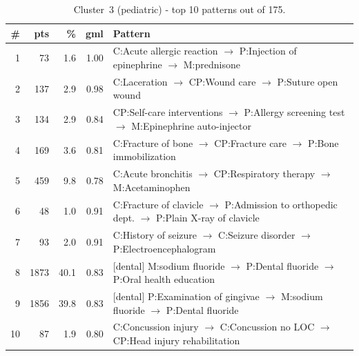 \begin{table}[H]
\centering
\footnotesize
\renewcommand{\arraystretch}{1.2}
\begin{tabular}{@{}r r r r p{10.5cm}@{}}
\toprule
\textbf{\#} & \textbf{pts} & \textbf{\%} & \textbf{gml} & \textbf{Pattern} \\
\midrule
1  &   73 &  1.6 & 1.00 & C:Acute allergic reaction $\to$ P:Injection of epinephrine $\to$ M:prednisone \\
2  &  137 &  2.9 & 0.98 & C:Laceration $\to$ CP:Wound care $\to$ P:Suture open wound \\
3  &  134 &  2.9 & 0.84 & CP:Self-care interventions $\to$ P:Allergy screening test $\to$ M:Epinephrine auto-injector \\
4  &  169 &  3.6 & 0.81 & C:Fracture of bone $\to$ CP:Fracture care $\to$ P:Bone immobilization \\
5  &  459 &  9.8 & 0.78 & C:Acute bronchitis $\to$ CP:Respiratory therapy $\to$ M:Acetaminophen \\
6  &   48 &  1.0 & 0.91 & C:Fracture of clavicle $\to$ P:Admission to orthopedic dept. $\to$ P:Plain X-ray of clavicle \\
7  &   93 &  2.0 & 0.91 & C:History of seizure $\to$ C:Seizure disorder $\to$ P:Electroencephalogram \\
8  & 1873 & 40.1 & 0.83 & [dental] M:sodium fluoride $\to$ P:Dental fluoride $\to$ P:Oral health education \\
9  & 1856 & 39.8 & 0.83 & [dental] P:Examination of gingivae $\to$ M:sodium fluoride $\to$ P:Dental fluoride \\
10 &   87 &  1.9 & 0.80 & C:Concussion injury $\to$ C:Concussion no LOC $\to$ CP:Head injury rehabilitation \\
\bottomrule
\end{tabular}
\caption{Cluster~3 (pediatric) - top 10 patterns out of 175.}
\label{tab:ch6_seq_c3}
\end{table}

